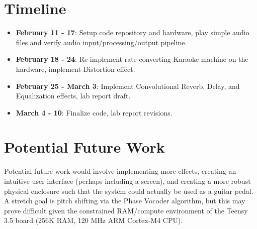 \documentclass{article}
\begin{document}
\section{Timeline}
\begin{itemize}
    \item \textbf{February 11 - 17}: Setup code repository and hardware, play simple audio files and verify audio input/processing/output pipeline.
    \item \textbf{February 18 - 24}: Re-implement rate-converting Karaoke machine on the hardware, implement Distortion effect.
    \item \textbf{February 25 - March 3}: Implement Convolutional Reverb, Delay, and Equalization effects, lab report draft.
    \item \textbf{March 4 - 10}: Finalize code, lab report revisions.
    
\end{itemize}

\section{Potential Future Work}

Potential future work would involve implementing more effects, creating an intuitive user interface (perhaps including a screen), and creating a more robust physical enclosure such that the system could actually be used as a guitar pedal. A stretch goal is pitch shifting via the Phase Vocoder algorithm, but this may prove difficult given the constrained RAM/compute environment of the Teensy 3.5 board (256K RAM, 120 MHz ARM Cortex-M4 CPU).
\end{document}
